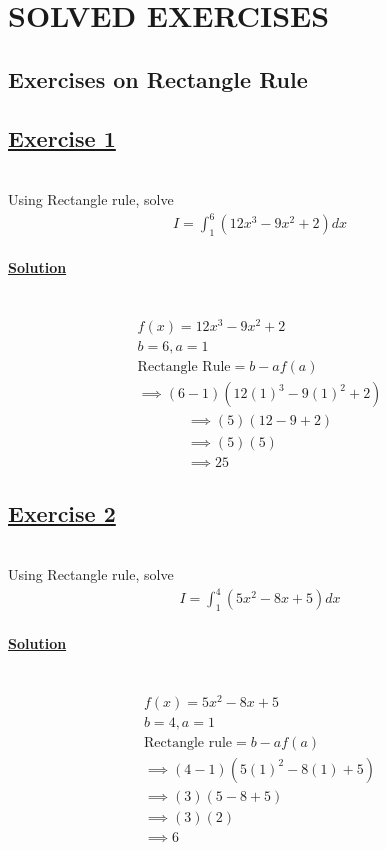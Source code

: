 \documentclass[12pt]{report}
\newcommand{\ubt}[1]{\textbf{\underline{#1}}}
\newcommand{\spn}[1]{\\[#1cm]}
\newcommand{\solution}{\subsubsection{\ubt{Solution}}{~}\spn{-2}}
\newcommand{\exercise}[1]{\section*{\ubt{Exercise #1}}{~}\spn{-1}}
\begin{document}
	
	\chapter{SOLVED EXERCISES}
	\section{Exercises on Rectangle Rule}
	\exercise{1}
	Using Rectangle rule, solve
	\begin{eqnarray*}
		I = \int_1^6 (12x^3 - 9x^2 + 2) dx
	\end{eqnarray*}
	\solution
	\begin{gather*}
		f(x) = 12x^3 - 9x^2 + 2\\
		b=6, a=1\\
		\text{Rectangle Rule} = b-af(a)\\
		\implies (6-1)(12(1)^3 - 9(1)^2 + 2)
	\end{gather*}
	\begin{gather*}
		\implies (5)(12-9+2)\\
		\implies (5)(5)\\
		\implies 25
	\end{gather*}
	
	\exercise{2}
	Using Rectangle rule, solve
	\begin{gather*}
		I=\int_1^4(5x^2-8x+5)dx
	\end{gather*}
	\solution
	\begin{gather*}
		f(x) = 5x^2 - 8x + 5\\
		b=4, a=1\\
		\text{Rectangle rule} = b-af(a)\\
		\implies (4-1)(5(1)^2 - 8(1) + 5)\\
		\implies (3)(5-8+5)\\
		\implies (3) (2)\\
		\implies 6
	\end{gather*}
	
\end{document}
